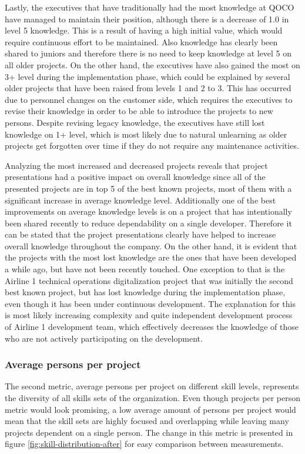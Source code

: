 Lastly, the executives that have traditionally had the most knowledge at QOCO have managed to maintain their position, although there is a decrease of 1.0 in level 5 knowledge. This is a result of having a high
initial value, which would require continuous effort to be maintained. Also knowledge has clearly been shared to juniors and therefore there is no need to keep knowledge at level 5 on all older projects.
On the other hand, the executives have also gained the most on 3+ level during the implementation phase, which could be explained by several older projects that have been raised from levels 1 and 2 to 3.
This has occurred due to personnel changes on the customer side, which requires the executives to revise their knowledge in order to be able to introduce the projects to new persons.
Despite revising legacy knowledge, the executives
have still lost knowledge on 1+ level, which is most likely due to natural unlearning as older projects get forgotten over time if they do not require any maintenance activities.

Analyzing the most increased and decreased projects reveals that project presentations had a positive impact on overall knowledge since all of the presented projects are in top 5 of the best known projects,
most of them with a significant increase in average knowledge level. Additionally one of the best improvements on average knowledge levels is on a project that has intentionally been shared recently to reduce
dependability on a single developer. Therefore it can be stated that the project presentations clearly have helped to increase overall knowledge throughout the company. On the other hand, it is evident that
the projects with the most lost knowledge are the ones that have been developed a while ago, but have not been recently touched. One exception to that is the Airline 1 technical operations digitalization project that
was initially the second best known project, but has lost knowledge during the implementation phase, even though it has been under continuous development. The explanation for this is most likely increasing
complexity and quite independent development process of Airline 1 development team, which effectively decreases the knowledge of those who are not actively participating on the development.

\subsubsection*{Average persons per project}

The second metric, average persons per project on different skill levels, represents the diversity of all skills sets of the organization. Even though projects per person metric would look promising, a low
average amount of persons per project would mean that the skill sets are highly focused and overlapping while leaving many projects dependent on a single person. The change in this metric is presented
in figure \ref{fig:skill-distribution-after} for easy comparison between measurements.


